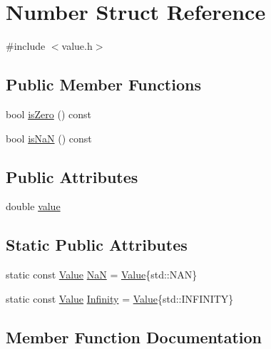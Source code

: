 \hypertarget{struct_number}{}\section{Number Struct Reference}
\label{struct_number}


{\ttfamily \#include $<$value.\+h$>$}

\subsection*{Public Member Functions}
\begin{DoxyCompactItemize}
\item 
bool \hyperlink{struct_number_a81a3c3689b85c8fe4ad70a275c8ba1b6}{is\+Zero} () const
\item 
bool \hyperlink{struct_number_a2f56b142a6c2f7a91435e4f2081466c5}{is\+NaN} () const
\end{DoxyCompactItemize}
\subsection*{Public Attributes}
\begin{DoxyCompactItemize}
\item 
double \hyperlink{struct_number_a39c0611c6e740a144f7450fe529f8f1e}{value}
\end{DoxyCompactItemize}
\subsection*{Static Public Attributes}
\begin{DoxyCompactItemize}
\item 
static const \hyperlink{value_8h_a1882706e4f2d631f705767ad4a973ee5}{Value} \hyperlink{struct_number_ae46de0f8d37f02b00dd6fa77a79af1f9}{NaN} = \hyperlink{value_8h_a1882706e4f2d631f705767ad4a973ee5}{Value}\{std\+::\+N\+AN\}
\item 
static const \hyperlink{value_8h_a1882706e4f2d631f705767ad4a973ee5}{Value} \hyperlink{struct_number_a78c5c53ddee47730fcbd10ad1af7c8ba}{Infinity} = \hyperlink{value_8h_a1882706e4f2d631f705767ad4a973ee5}{Value}\{std\+::\+I\+N\+F\+I\+N\+I\+TY\}
\end{DoxyCompactItemize}


\subsection{Member Function Documentation}
\mbox{\label{struct_number_a2f56b142a6c2f7a91435e4f2081466c5}} 
